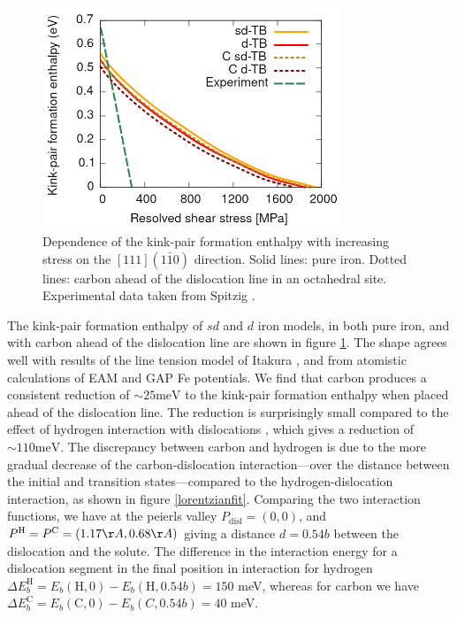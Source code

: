 \documentclass[a4paper,11pt]{article}
\numberwithin{equation}{chapter}
\numberwithin{listing}{chapter}
\begin{document}
\begin{figure}[htbp]
\centering
\includegraphics[width=0.8\textwidth]{iron/Images/kink-pair_formation_enthalpies_dTB_sdTB_2000_big.png}
\caption{Dependence of the kink-pair formation enthalpy with increasing stress on the \([111](1\bar{1}0)\) direction. Solid lines: pure iron. Dotted lines: carbon ahead of the dislocation line in an octahedral site. Experimental data taken from Spitzig \cite{Spitzig_1970}. \label{kinkpairstress}}
\end{figure}



The kink-pair formation enthalpy of \(sd\) and \(d\) iron models, in both pure
iron, and with carbon ahead of the dislocation line are shown in figure
\ref{kinkpairstress}. The shape agrees well with results of the line tension
model of Itakura \cite{Itakura2012}, and from atomistic calculations of EAM
\cite{Proville2012} and GAP \cite{Maresca2018} Fe potentials. We find that
carbon produces a consistent reduction of \(\sim 25\text{meV}\) to the
kink-pair formation enthalpy when placed ahead of the dislocation line. The
reduction is surprisingly small compared to the effect of hydrogen
interaction with dislocations
\cite{itakura13_effec_hydrog_atoms_screw_disloc}, which gives a reduction of \(\sim 110 \text{meV}\). The discrepancy between carbon and hydrogen is due to
the more gradual decrease of the carbon-dislocation interaction---over the
distance between the initial and transition states---compared to the
hydrogen-dislocation interaction, as shown in figure
\ref{lorentzianfit}. Comparing the two interaction functions, we have at the
peierls valley \(P_{\text{disl}}=(0,0)\), and \(P^{\text{H}} = P^{\text{C}} =
    (1.17 \AA, 0.68 \AA)\) giving a distance \(d = 0.54b\) between the dislocation and
the solute. The difference in the interaction energy for a dislocation
segment in the final position in interaction for hydrogen \(\Delta
    E_b^{\text{H}} = E_b(\text{H},0) - E_b(\text{H},0.54b) = 150\) meV, whereas
for carbon we have \(\Delta E_b^{\text{C}} = E_b(\text{C},0) - E_b(C,0.54b) =
    40\) meV.
\end{document}
